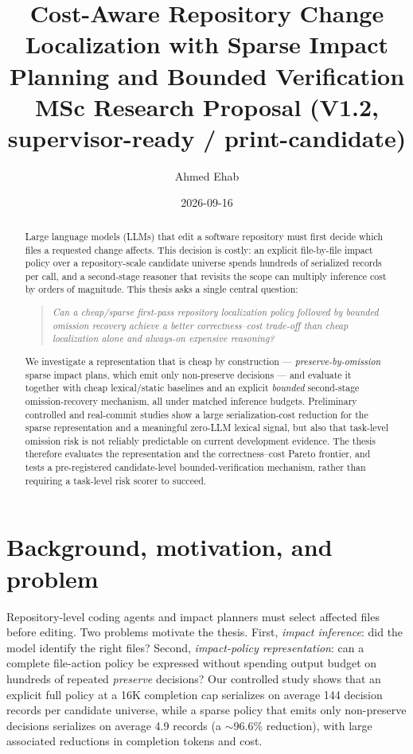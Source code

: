 \documentclass[11pt,a4paper]{article}
\title{\textbf{Cost-Aware Repository Change Localization with Sparse Impact\\[2pt]
Planning and Bounded Verification}\\[6pt]
\large MSc Research Proposal (V1.2, supervisor-ready / print-candidate)}
\author{Ahmed Ehab}
\date{2026-09-16}
\begin{document}
\maketitle

\begin{abstract}
Large language models (LLMs) that edit a software repository must first decide
which files a requested change affects. This decision is costly: an explicit
file-by-file impact policy over a repository-scale candidate universe spends
hundreds of serialized records per call, and a second-stage reasoner that
revisits the scope can multiply inference cost by orders of magnitude. This
thesis asks a single central question:

\begin{quote}
\emph{Can a cheap/sparse first-pass repository localization policy followed by
bounded omission recovery achieve a better correctness--cost trade-off than
cheap localization alone and always-on expensive reasoning?}
\end{quote}

We investigate a representation that is cheap by construction ---
\emph{preserve-by-omission} sparse impact plans, which emit only non-preserve
decisions --- and evaluate it together with cheap lexical/static baselines and
an explicit \emph{bounded} second-stage omission-recovery mechanism, all under
matched inference budgets. Preliminary controlled and real-commit studies show
a large serialization-cost reduction for the sparse representation and a
meaningful zero-LLM lexical signal, but also that task-level omission risk is
not reliably predictable on current development evidence. The thesis therefore
evaluates the representation and the correctness--cost Pareto frontier, and
tests a pre-registered candidate-level bounded-verification mechanism, rather
than requiring a task-level risk scorer to succeed.
\end{abstract}

\section{Background, motivation, and problem}
\label{sec:background}

Repository-level coding agents and impact planners must select affected files
before editing. Two problems motivate the thesis. First, \emph{impact
inference}: did the model identify the right files? Second,
\emph{impact-policy representation}: can a complete file-action policy be
expressed without spending output budget on hundreds of repeated
\emph{preserve} decisions? Our controlled study shows that an explicit full
policy at a 16K completion cap serializes on average 144 decision records per
candidate universe, while a sparse policy that emits only non-preserve
decisions serializes on average 4.9 records (a $\sim$96.6\% reduction), with
large associated reductions in completion tokens and cost.
\end{document}
